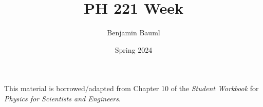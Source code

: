 \documentclass[]{article}
\title{PH 221 Week \Week}
\author{Benjamin Bauml}
\date{Spring 2024}
\newcommand{\FileDepth}{../../..}
\begin{document}
\maketitle
\begin{center}
	This material is borrowed/adapted from Chapter 10 of the \textit{Student Workbook} for \textit{Physics for Scientists and Engineers}.
\end{center}





\end{document}
